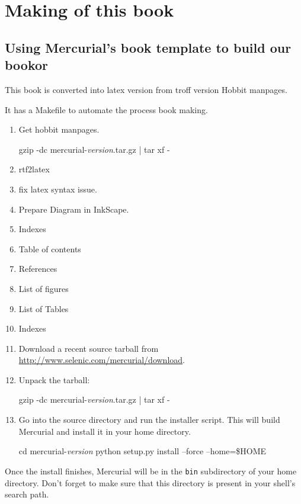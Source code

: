 \chapter{Making of this book}
\label{chap:bookmaking}

\section{Using Mercurial's book template to build our bookor}
\label{sec:srcinstall:unixlike}

This book is converted into latex version from troff version Hobbit manpages.

It has a Makefile to automate the process book making.
\begin{enumerate}
\item Get hobbit manpages.
  \begin{codesample4}
    gzip -dc mercurial-\emph{version}.tar.gz | tar xf -
  \end{codesample4}
\item rtf2latex
\item fix latex syntax issue.
\item Prepare Diagram in InkScape.
\item Indexes
\item Table of contents
\item References
\item List of figures
\item List of Tables
\item Indexes
\item Download a recent source tarball from
  \url{http://www.selenic.com/mercurial/download}.
\item Unpack the tarball:
  \begin{codesample4}
    gzip -dc mercurial-\emph{version}.tar.gz | tar xf -
  \end{codesample4}
\item Go into the source directory and run the installer script.  This
  will build Mercurial and install it in your home directory.
  \begin{codesample4}
    cd mercurial-\emph{version}
    python setup.py install --force --home=\$HOME
  \end{codesample4}
\end{enumerate}



Once the install finishes, Mercurial will be in the \texttt{bin}
subdirectory of your home directory.  Don't forget to make sure that
this directory is present in your shell's search path.

